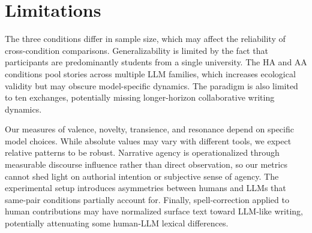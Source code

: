 \documentclass[11pt]{article}
\begin{document}
\section*{Limitations}

The three conditions differ in sample size, which may affect the reliability of cross-condition comparisons. Generalizability is limited by the fact that participants are predominantly students from a single university. The HA and AA conditions pool stories across multiple LLM families, which increases ecological validity but may obscure model-specific dynamics. The paradigm is also limited to ten exchanges, potentially missing longer-horizon collaborative writing dynamics.

Our measures of valence, novelty, transience, and resonance depend on specific model choices. While absolute values may vary with different tools, we expect relative patterns to be robust. Narrative agency is operationalized through measurable discourse influence rather than direct observation, so our metrics cannot shed light on authorial intention or subjective sense of agency. The experimental setup introduces asymmetries between humans and LLMs that same-pair conditions partially account for. Finally, spell-correction applied to human contributions may have normalized surface text toward LLM-like writing, potentially attenuating some human-LLM lexical differences.


\end{document}
